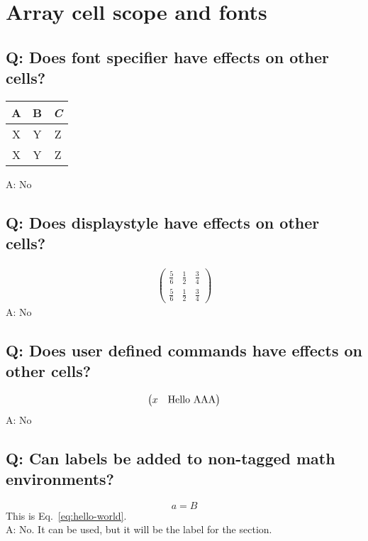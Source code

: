\documentclass[11pt]{revtex4-1}
\begin{document}
\section{Array cell scope and fonts}

\subsection*{Q: Does font specifier have effects on other cells?}
\begin{tabular}{c||cc}
\ttfamily A & \bfseries B & \itshape C \\ \hline\hline
X & Y & Z \\
X & Y & Z
\end{tabular}
A: No

\subsection*{Q: Does displaystyle have effects on other cells?}
\begin{align}
  \begin{pmatrix}
    \frac56 & \frac12 & \frac34 \\
    \frac56 & \displaystyle \frac12 & \frac34
  \end{pmatrix}
\end{align}
A: No

\subsection*{Q: Does user defined commands have effects on other cells?}
\begin{align}
  \def\AAA{AAA}
  \begin{pmatrix}
    x \def\AAA{World} & \text{Hello \AAA}
  \end{pmatrix}
\end{align}
A: No

\subsection*{Q: Can labels be added to non-tagged math environments?}
\[
  a=B
  \label{eq:hello-world}\tag{A}
\]
This is Eq.~\eqref{eq:hello-world}. \\
A: No. It can be used, but it will be the label for the section.
\end{document}
